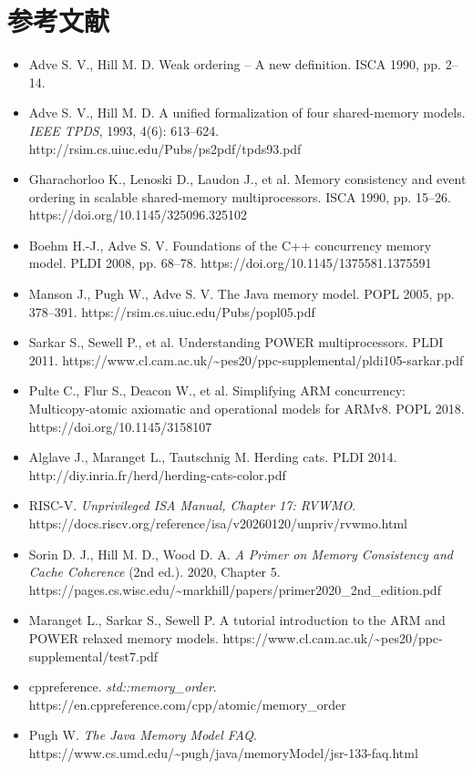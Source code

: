 \section*{参考文献}
\begin{itemize}
\item Adve S. V., Hill M. D. Weak ordering – A new definition. ISCA 1990, pp. 2–14.
\item Adve S. V., Hill M. D. A unified formalization of four shared-memory models. \emph{IEEE TPDS}, 1993, 4(6): 613–624. http://rsim.cs.uiuc.edu/Pubs/ps2pdf/tpds93.pdf
\item Gharachorloo K., Lenoski D., Laudon J., et al. Memory consistency and event ordering in scalable shared-memory multiprocessors. ISCA 1990, pp. 15–26. https://doi.org/10.1145/325096.325102
\item Boehm H.-J., Adve S. V. Foundations of the C++ concurrency memory model. PLDI 2008, pp. 68–78. https://doi.org/10.1145/1375581.1375591
\item Manson J., Pugh W., Adve S. V. The Java memory model. POPL 2005, pp. 378–391. https://rsim.cs.uiuc.edu/Pubs/popl05.pdf
\item Sarkar S., Sewell P., et al. Understanding POWER multiprocessors. PLDI 2011. https://www.cl.cam.ac.uk/\textasciitilde{}pes20/ppc-supplemental/pldi105-sarkar.pdf
\item Pulte C., Flur S., Deacon W., et al. Simplifying ARM concurrency: Multicopy-atomic axiomatic and operational models for ARMv8. POPL 2018. https://doi.org/10.1145/3158107
\item Alglave J., Maranget L., Tautschnig M. Herding cats. PLDI 2014. http://diy.inria.fr/herd/herding-cats-color.pdf
\item RISC-V. \emph{Unprivileged ISA Manual, Chapter 17: RVWMO}. https://docs.riscv.org/reference/isa/v20260120/unpriv/rvwmo.html
\item Sorin D. J., Hill M. D., Wood D. A. \emph{A Primer on Memory Consistency and Cache Coherence} (2nd ed.). 2020, Chapter 5. https://pages.cs.wisc.edu/\textasciitilde{}markhill/papers/primer2020\_2nd\_edition.pdf
\item Maranget L., Sarkar S., Sewell P. A tutorial introduction to the ARM and POWER relaxed memory models. https://www.cl.cam.ac.uk/\textasciitilde{}pes20/ppc-supplemental/test7.pdf
\item cppreference. \emph{std::memory\_order}. https://en.cppreference.com/cpp/atomic/memory\_order
\item Pugh W. \emph{The Java Memory Model FAQ}. https://www.cs.umd.edu/\textasciitilde{}pugh/java/memoryModel/jsr-133-faq.html
\end{itemize}
